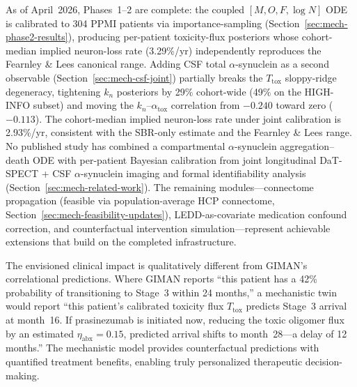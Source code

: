 As of April~2026, Phases~1--2 are complete: the coupled $[M, O, F, \log N]$ ODE is calibrated to 304 PPMI patients via importance-sampling (Section~\ref{sec:mech-phase2-results}), producing per-patient toxicity-flux posteriors whose cohort-median implied neuron-loss rate (3.29\%/yr) independently reproduces the Fearnley \& Lees canonical range. Adding CSF total $\alpha$-synuclein as a second observable (Section~\ref{sec:mech-csf-joint}) partially breaks the $T_\text{tox}$ sloppy-ridge degeneracy, tightening $k_n$ posteriors by 29\% cohort-wide (49\% on the HIGH-INFO subset) and moving the $k_n$--$\alpha_\text{tox}$ correlation from $-0.240$ toward zero ($-0.113$). The cohort-median implied neuron-loss rate under joint calibration is 2.93\%/yr, consistent with the SBR-only estimate and the Fearnley \& Lees range. No published study has combined a compartmental $\alpha$-synuclein aggregation--death ODE with per-patient Bayesian calibration from joint longitudinal DaT-SPECT + CSF $\alpha$-synuclein imaging and formal identifiability analysis (Section~\ref{sec:mech-related-work}). The remaining modules---connectome propagation (feasible via population-average HCP connectome, Section~\ref{sec:mech-feasibility-updates}), LEDD-as-covariate medication confound correction, and counterfactual intervention simulation---represent achievable extensions that build on the completed infrastructure.

The envisioned clinical impact is qualitatively different from GIMAN's correlational predictions. Where GIMAN reports ``this patient has a 42\% probability of transitioning to Stage~3 within 24 months,'' a mechanistic twin would report ``this patient's calibrated toxicity flux $T_\text{tox}$ predicts Stage~3 arrival at month~16. If prasinezumab is initiated now, reducing the toxic oligomer flux by an estimated $\eta_\text{abx} = 0.15$, predicted arrival shifts to month~28---a delay of 12 months.'' The mechanistic model provides counterfactual predictions with quantified treatment benefits, enabling truly personalized therapeutic decision-making.

